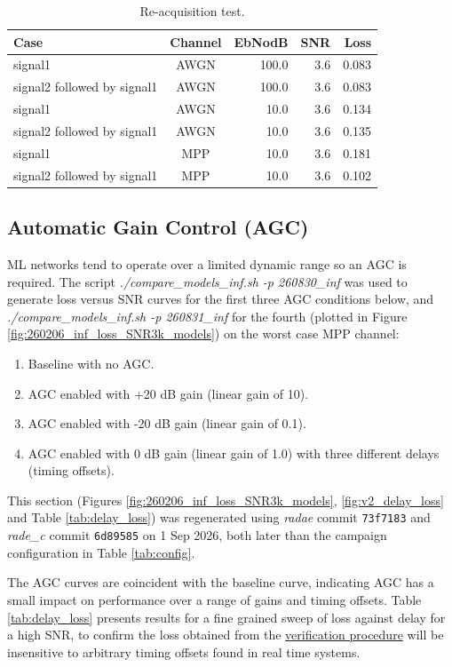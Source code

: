 \documentclass{article}
\begin{document}
\begin{table} [h]
\caption{Re-acquisition test.}
\label{tab:re_acq}
\centering
\begin{tabular}{ l | c | r | r | r }
 \hline
 Case & Channel & EbNodB & SNR & Loss \\
 \hline
 signal1                     & AWGN & 100.0 & 3.6 & 0.083 \\
 signal2 followed by signal1 & AWGN & 100.0 & 3.6 & 0.083 \\
 signal1                     & AWGN & 10.0 & 3.6 & 0.134 \\
 signal2 followed by signal1 & AWGN & 10.0 & 3.6 & 0.135 \\
 signal1                     & MPP & 10.0 & 3.6 & 0.181 \\
 signal2 followed by signal1 & MPP & 10.0 & 3.6 & 0.102 \\
  \hline
\end{tabular}
\end{table}

\subsection{Automatic Gain Control (AGC)}

ML networks tend to operate over a limited dynamic range so an AGC is required.  The script \emph{./compare\_models\_inf.sh -p 260830\_inf} was used to generate loss versus SNR curves for the first three AGC conditions below, and \emph{./compare\_models\_inf.sh -p 260831\_inf} for the fourth (plotted in Figure \ref{fig:260206_inf_loss_SNR3k_models}) on the worst case MPP channel:
\begin{enumerate}
\item Baseline with no AGC.
\item AGC enabled with +20 \si{dB} gain (linear gain of 10).
\item AGC enabled with -20 \si{dB} gain (linear gain of 0.1).
\item AGC enabled with 0 \si{dB} gain (linear gain of 1.0) with three different delays (timing offsets).
\end{enumerate}
This section (Figures \ref{fig:260206_inf_loss_SNR3k_models}, \ref{fig:v2_delay_loss} and Table \ref{tab:delay_loss}) was regenerated using \emph{radae} commit \texttt{73f7183} and \emph{rade\_c} commit \texttt{6d89585} on 1 Sep 2026, both later than the campaign configuration in Table \ref{tab:config}.

The AGC curves are coincident with the baseline curve, indicating AGC has a small impact on performance over a range of gains and timing offsets.  Table \ref{tab:delay_loss} presents results for a fine grained sweep of loss against delay for a high SNR, to confirm the loss obtained from the \href{https://github.com/drowe67/radae/#verifying-rade-integration}{verification procedure} will be insensitive to arbitrary timing offsets found in real time systems.
\end{document}
